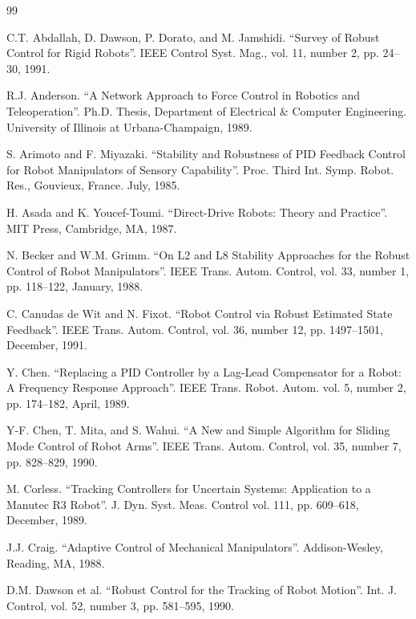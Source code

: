 \documentclass[UTF8,12pt,a4paper]{ctexart}
\begin{document}
\begin{thebibliography}{99}

C.T. Abdallah, D. Dawson, P. Dorato, and M. Jamshidi.
``Survey of Robust Control for Rigid Robots''. IEEE Control Syst. Mag., vol. 11, number 2, pp. 24--30, 1991.

R.J. Anderson.
``A Network Approach to Force Control in Robotics and Teleoperation''. Ph.D. Thesis, Department of Electrical \& Computer Engineering. University of Illinois at Urbana-Champaign, 1989.

S. Arimoto and F. Miyazaki.
``Stability and Robustness of PID Feedback Control for Robot Manipulators of Sensory Capability''. Proc. Third Int. Symp. Robot. Res., Gouvieux, France. July, 1985.

H. Asada and K. Youcef-Toumi.
``Direct-Drive Robots: Theory and Practice''. MIT Press, Cambridge, MA, 1987.

N. Becker and W.M. Grimm.
``On L2 and L8 Stability Approaches for the Robust Control of Robot Manipulators''. IEEE Trans. Autom. Control, vol. 33, number 1, pp. 118--122, January, 1988.

C. Canudas de Wit and N. Fixot.
``Robot Control via Robust Estimated State Feedback''. IEEE Trans. Autom. Control, vol. 36, number 12, pp. 1497--1501, December, 1991.

Y. Chen.
``Replacing a PID Controller by a Lag-Lead Compensator for a Robot: A Frequency Response Approach''. IEEE Trans. Robot. Autom. vol. 5, number 2, pp. 174--182, April, 1989.

Y-F. Chen, T. Mita, and S. Wahui.
``A New and Simple Algorithm for Sliding Mode Control of Robot Arms''. IEEE Trans. Autom. Control, vol. 35, number 7, pp. 828--829, 1990.

M. Corless.
``Tracking Controllers for Uncertain Systems: Application to a Manutec R3 Robot''. J. Dyn. Syst. Meas. Control vol. 111, pp. 609--618, December, 1989.

J.J. Craig.
``Adaptive Control of Mechanical Manipulators''. Addison-Wesley, Reading, MA, 1988.

D.M. Dawson et al.
``Robust Control for the Tracking of Robot Motion''. Int. J. Control, vol. 52, number 3, pp. 581--595, 1990.


\end{thebibliography}
\end{document}
